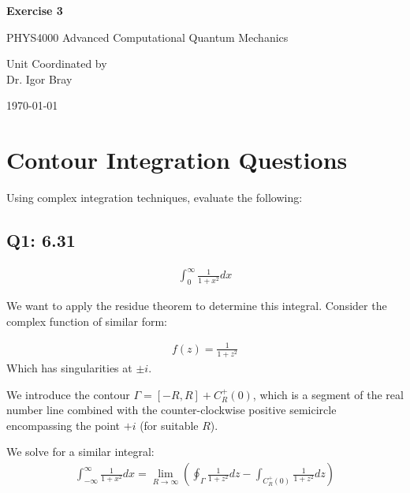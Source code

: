 \documentclass{article}
\begin{document}
\newpage
\begin{center}
       
       \vspace*{1cm}
        \LARGE
       \textbf{Exercise 3}

       \vspace{0.5cm}
        PHYS4000
        Advanced Computational Quantum Mechanics
            
       \vspace{1.5cm}

       \bigskip

       Unit Coordinated by\\
       Dr. Igor Bray
            
       \vspace{0.8cm}
     
            
       
        \today
            
\end{center}
\newpage

	\section{Contour Integration Questions}
	Using complex integration techniques, evaluate the following:
		\subsection{Q1: 6.31}
			\begin{gather}
				\int_{0}^{\infty} \frac{1}{1+x^2}dx
			\end{gather}
			
			We want to apply the residue theorem to determine this integral.
			Consider the complex function of similar form:
			
			\begin{gather}
				f(z) = \frac{1}{1+z^2}
			\end{gather}
			Which has singularities at $\pm i$. 
			
			We introduce the contour $\Gamma = [-R,R] + C^{+}_{R}(0)$, which is a segment of the real number line combined with the counter-clockwise positive semicircle encompassing the point $+i$ (for suitable $R$). 
			
			We solve for a similar integral:
			\begin{gather}
				\int_{-\infty}^{\infty}\frac{1}{1+x^2}dx = \lim_{R\to\infty} \left( \oint_{\Gamma}\frac{1}{1+z^2}dz - \int_{ C^{+}_{R}(0)}\frac{1}{1+z^2}dz\right)
			\end{gather}
			
\end{document}
